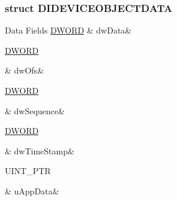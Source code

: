 \subsubsection{struct D\-I\-D\-E\-V\-I\-C\-E\-O\-B\-J\-E\-C\-T\-D\-A\-T\-A}
\begin{DoxyFields}{Data Fields}
\hypertarget{a00003_ad38b92af7d164a277eb2d30b5e65a489}{\hyperlink{a00003_a50e15ae51c87ae06ab29c8148cb5f36c}{D\-W\-O\-R\-D}}\label{a00003_ad38b92af7d164a277eb2d30b5e65a489}
&
dw\-Data&
\\
\hline

\hypertarget{a00003_a2f0da10f0bff2a910138cc1b5715cdd5}{\hyperlink{a00003_a50e15ae51c87ae06ab29c8148cb5f36c}{D\-W\-O\-R\-D}}\label{a00003_a2f0da10f0bff2a910138cc1b5715cdd5}
&
dw\-Ofs&
\\
\hline

\hypertarget{a00003_a62ab582c7122462282999b7ee4e41e09}{\hyperlink{a00003_a50e15ae51c87ae06ab29c8148cb5f36c}{D\-W\-O\-R\-D}}\label{a00003_a62ab582c7122462282999b7ee4e41e09}
&
dw\-Sequence&
\\
\hline

\hypertarget{a00003_a0c07d43e437af5d01b1f043f0744d598}{\hyperlink{a00003_a50e15ae51c87ae06ab29c8148cb5f36c}{D\-W\-O\-R\-D}}\label{a00003_a0c07d43e437af5d01b1f043f0744d598}
&
dw\-Time\-Stamp&
\\
\hline

\hypertarget{a00003_ac83b0c009034bac2df91a2c0bed20494}{U\-I\-N\-T\-\_\-\-P\-T\-R}\label{a00003_ac83b0c009034bac2df91a2c0bed20494}
&
u\-App\-Data&
\\
\hline

\end{DoxyFields}
\label{d1/d09/a00077}
\hypertarget{a00003_d1/d09/a00077}{}
